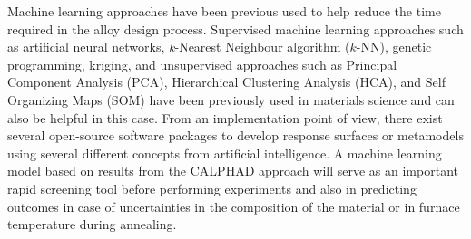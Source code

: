 Machine learning approaches  have been previous used to help reduce the time required in the alloy design process.\cite{jha2017SOM, jha2017magnetic_Book_Chapter, jha2016algorithms_JALCOM, jha2016combined_PhD_Thesis, fan_Jha_2016formation_IEEE, jha2015COBEM, jha2015magnetic_ACEX, jha2015algorithms_ICMM4, fan_jha2016evolution_JMMM, jha2015superalloy_MAMP, jha2014superalloy_ASME} Supervised machine learning approaches such as artificial neural networks,\cite{ann_pettersson2007genetic, jha2015superalloy_MAMP, jha2014_SRI, jha2014superalloy_ASME} \emph{k}-Nearest Neighbour algorithm ($k$-NN),\cite{K_NN_Algorithm, jha2014superalloy_ASME} genetic programming,\cite{biogp_giri2013genetic, jha2015superalloy_MAMP, jha2014_SRI, jha2014superalloy_ASME} kriging,\cite{kriging_pantula2017kernel, kriging_chugh2017data} and unsupervised approaches such as Principal Component Analysis (PCA),\cite{jha2016algorithms_JALCOM, jha2016combined_PhD_Thesis,jha2015algorithms_ICMM4} Hierarchical Clustering Analysis (HCA),\cite{jha2017magnetic_Book_Chapter, jha2016combined_PhD_Thesis, jha2015magnetic_ACEX} and Self Organizing Maps (SOM)\cite{jha2017SOM} have been previously used in materials science and can also be helpful in this case. From an implementation point of view, there exist several open-source software packages to develop response surfaces or metamodels using several different concepts from artificial intelligence. A machine learning model based on results from the CALPHAD approach  will serve as an important rapid screening tool before performing experiments and also in predicting outcomes in case of uncertainties in the composition of the material or in furnace temperature  during annealing.



